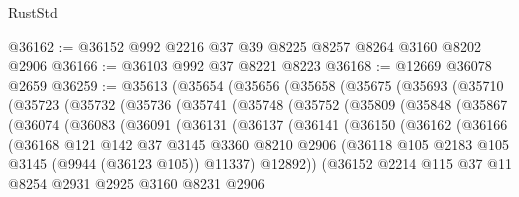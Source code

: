 \begin{lexlean}{RustStd}
\begin{coremodule}
@36162 := @36152 @992 @2216 @37 @39 @8225 @8257 @8264 @3160 @8202 @2906
@36166 := @36103 @992 @37 @8221 @8223
@36168 := @12669 @36078 @2659
@36259 := @35613
    (@35654
      (@35656
        (@35658
          (@35675
            (@35693
              (@35710
                (@35723
                  (@35732
                    (@35736
                      (@35741
                        (@35748
                          (@35752
                            (@35809
                              (@35848
                                (@35867
                                  (@36074
                                    (@36083
                                      (@36091
                                        (@36131
                                          (@36137
                                            (@36141
                                              (@36150
                                                (@36162
                                                  (@36166
                                                    (@36168
                                                      @121
                                                      @142
                                                      @37
                                                      @3145
                                                      @3360
                                                      @8210
                                                      @2906
                                                      (@36118
                                                        @105
                                                        @2183
                                                        @105
                                                        @3145
                                                        (@9944 (@36123 @105))
                                                        @11337)
                                                      @12892))
                                                  (@36152
                                                    @2214
                                                    @115
                                                    @37
                                                    @11
                                                    @8254
                                                    @2931
                                                    @2925
                                                    @3160
                                                    @8231
                                                    @2906

\end{coremodule}
\end{lexlean}
